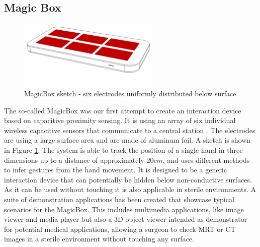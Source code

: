 \subsection{Magic Box}
\begin{figure}[h]
\centering
\includegraphics[width=0.6\textwidth]{images/magicbox}
\caption{MagicBox sketch - six electrodes uniformly distributed below surface}
\label{fig:magicbox_sketch}
\end{figure}
The so-called MagicBox was our first attempt to create an interaction device based on capacitive proximity sensing. It is using an array of six individual wireless capacitive sensors that communicate to a central station \cite{Braun2011MultiInputDevice}. The electrodes are using a large surface area and are made of aluminum foil. A sketch is shown in Figure \ref{fig:magicbox_sketch}. The system is able to track the position of a single hand in three dimensions up to a distance of approximately $20cm$, and uses different methods to infer gestures from the hand movement. 
It is designed to be a generic interaction device that can potentially be hidden below non-conductive surfaces. As it can be used without touching it is also applicable in sterile environments. A suite of demonstration applications has been created that showcase typical scenarios for the MagicBox. This includes multimedia applications, like image viewer and media player but also a 3D object viewer intended as demonstrator for potential medical applications, allowing a surgeon to check MRT or CT images in a sterile environment without touching any surface.

